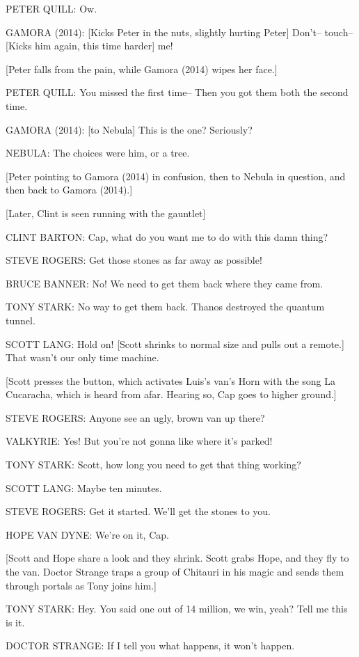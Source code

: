 PETER QUILL: Ow.

GAMORA (2014): [Kicks Peter in the nuts, slightly hurting Peter] Don't– touch– [Kicks him again, this time harder] me!

[Peter falls from the pain, while Gamora (2014) wipes her face.]

PETER QUILL: You missed the first time– Then you got them both the second time.

GAMORA (2014): [to Nebula] This is the one? Seriously?

NEBULA: The choices were him, or a tree.

[Peter pointing to Gamora (2014) in confusion, then to Nebula in question, and then back to Gamora (2014).]

[Later, Clint is seen running with the gauntlet]

CLINT BARTON: Cap, what do you want me to do with this damn thing?

STEVE ROGERS: Get those stones as far away as possible!

BRUCE BANNER: No! We need to get them back where they came from.

TONY STARK: No way to get them back. Thanos destroyed the quantum tunnel.

SCOTT LANG: Hold on! [Scott shrinks to normal size and pulls out a remote.] That wasn't our only time machine.

[Scott presses the button, which activates Luis's van's Horn with the song La Cucaracha, which is heard from afar. Hearing so, Cap goes to higher ground.]

STEVE ROGERS: Anyone see an ugly, brown van up there?

VALKYRIE: Yes! But you're not gonna like where it's parked!

TONY STARK: Scott, how long you need to get that thing working?

SCOTT LANG: Maybe ten minutes.

STEVE ROGERS: Get it started. We'll get the stones to you.

HOPE VAN DYNE: We're on it, Cap.

[Scott and Hope share a look and they shrink. Scott grabs Hope, and they fly to the van. Doctor Strange traps a group of Chitauri in his magic and sends them through portals as Tony joins him.]

TONY STARK: Hey. You said one out of 14 million, we win, yeah? Tell me this is it.

DOCTOR STRANGE: If I tell you what happens, it won't happen.

